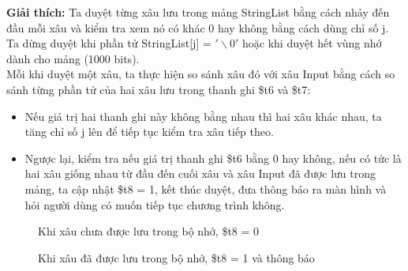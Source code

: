 \documentclass[a4paper,12pt]{article}
\begin{document}
\textbf{Giải thích: }
Ta duyệt từng xâu lưu trong mảng StringList bằng cách nhảy đến đầu mỗi xâu và kiểm tra xem nó có khác 0 hay không bằng cách dùng chỉ số j. Ta dừng duyệt khi phần tử StringList[j] = $'\backslash {0}'$ hoặc khi duyệt hết vùng nhớ dành cho mảng (1000 bits). \\
Mỗi khi duyệt một xâu, ta thực hiện so sánh xâu đó với xâu Input bằng cách so sánh từng phần tử của hai xâu lưu trong thanh ghi \$t6 và \$t7:
\begin{itemize}
    \item Nếu giá trị hai thanh ghi này không bằng nhau thì hai xâu khác nhau, ta tăng chỉ số j lên để tiếp tục kiểm tra xâu tiếp theo.
    \item Ngược lại, kiểm tra nếu giá trị thanh ghi \$t6 bằng 0 hay không, nếu có tức là hai xâu giống nhau từ đầu đến cuối xâu và xâu Input đã được lưu trong mảng, ta cập nhật \$t8 = 1, kết thúc duyệt, đưa thông báo ra màn hình và hỏi người dùng có muốn tiếp tục chương trình không.
\end{itemize}  
\begin{figure}[!h]
	\centerline{}
	\caption{Khi xâu chưa được lưu trong bộ nhớ, \$t8 = 0}
	\label{fig:bai1}
\end{figure}
\begin{figure}[!h]
	\centerline{}
	\caption{Khi xâu đã được lưu trong bộ nhớ, \$t8 = 1 và thông báo}
	\label{fig:bai1}
\end{figure}
\clearpage
\end{document}
